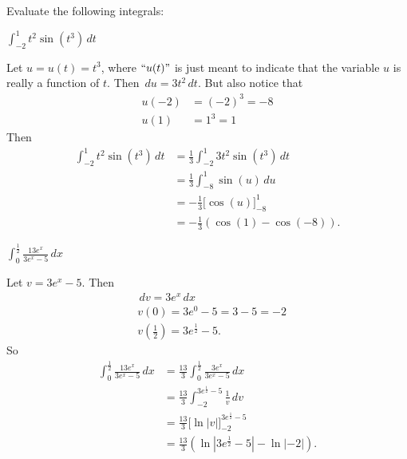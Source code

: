 \documentclass[nooutcomes]{ximera}
\renewcommand{\d}{\,d}
\newcommand{\eval}[1]{\bigg[ #1 \bigg]}
\renewenvironment{freeResponse}{
\ifhandout\setbox0\vbox\bgroup\else
\begin{trivlist}\item[\hskip \labelsep\bfseries Solution:\hspace{2ex}]
\fi}
{\ifhandout\egroup\else
\end{trivlist}
\fi}
\begin{document}
	
\begin{problem}
Evaluate the following integrals:

	\begin{enumerate}
	
	\item  $\int_{-2}^1 t^2 \sin(t^3) \d t$
		\begin{freeResponse}
		Let $u=u(t) = t^3$, where $``u(t)"$ is just meant to indicate that the variable $u$ is really a function of $t$.  Then $\d u = 3t^2 \d t$.  But also notice that
			\begin{align*}
			u(-2) &= (-2)^3 = -8  \\
			u(1) &= 1^3 = 1
			\end{align*}
		Then
			\begin{align*}
			\int_{-2}^1 t^2 \sin(t^3) \d t &= \frac{1}{3} \int_{-2}^1 3 t^2 \sin(t^3) \d t  \\
			&= \frac{1}{3} \int_{-8}^1 \sin(u) \d u  \\
			&= - \frac{1}{3} \eval{\cos(u)}_{-8}^1  \\
			&= - \frac{1}{3} ( \cos(1) - \cos(-8)).
			\end{align*}
		\end{freeResponse}
		
		
		
	\item  $\int_0^{\frac{1}{2}} \frac{13e^x}{3e^x - 5} \d x$
		\begin{freeResponse}
		Let $v=3e^x - 5$.  Then
			\begin{align*}
			&\d v = 3e^x \d x  \\
			&v(0) = 3e^0 -5= 3-5=-2  \\
			&v\left( \frac{1}{2} \right) = 3e^{\frac{1}{2}} - 5.
			\end{align*}
		So
			\begin{align*}
			\int_0^{\frac{1}{2}} \frac{13e^x}{3e^x - 5} \d x &= \frac{13}{3} \int_0^{\frac{1}{2}} \frac{3e^x}{3e^x - 5} \d x  \\
			&= \frac{13}{3} \int_{-2}^{3e^{\frac{1}{2}}-5} \frac{1}{v} \d v  \\
			&= \frac{13}{3} \eval{\ln|v|}_{-2}^{3e^{\frac{1}{2}}-5}  \\
			&= \frac{13}{3} \left( \ln|3e^{\frac{1}{2}}-5| - \ln|-2| \right).  \\
			\end{align*}
		\end{freeResponse}
		
		
		
	\end{enumerate}
			
			
	
\end{problem}
\end{document}
